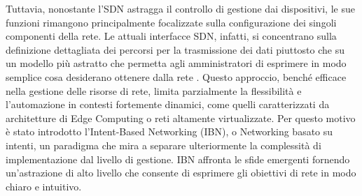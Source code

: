 \newline Tuttavia, nonostante l'SDN astragga il controllo di gestione dai dispositivi, le sue funzioni rimangono principalmente focalizzate sulla configurazione dei singoli componenti della rete. Le attuali interfacce SDN, infatti, si concentrano sulla definizione dettagliata dei percorsi per la trasmissione dei dati 
piuttosto che su un modello più astratto che permetta agli amministratori di esprimere in modo semplice cosa desiderano ottenere dalla rete \cite{sdnart}. 
Questo approccio, benché efficace nella gestione delle risorse di rete, limita parzialmente la flessibilità e l'automazione in contesti fortemente dinamici, come quelli caratterizzati da architetture di Edge Computing o reti altamente virtualizzate.
\newline Per questo motivo è stato introdotto l'Intent-Based Networking (IBN), o Networking basato su intenti, un paradigma che mira a separare ulteriormente la complessità di implementazione dal livello di gestione. 
IBN affronta le sfide emergenti fornendo un'astrazione di alto livello che consente di esprimere gli obiettivi di rete in modo chiaro e intuitivo.  
